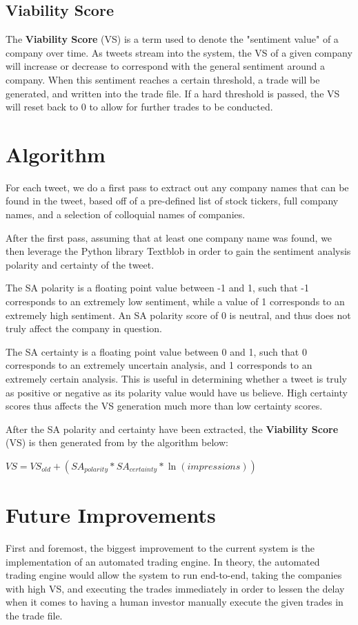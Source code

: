 \documentclass[11pt]{article}
\begin{document}
\subsection{Viability Score}
The {\bf Viability Score} (VS) is a term used
to denote the "sentiment value" of a company
over time. As tweets stream into the system,
the VS of a given company will increase or
decrease to correspond with the general
sentiment around a company. When this sentiment
reaches a certain threshold, a trade will be
generated, and written into the trade file.
If a hard threshold is passed, the VS will
reset back to 0 to allow for further trades
to be conducted.

\section{Algorithm}
For each tweet, we do a first pass to extract
out any company names that can be found in the
tweet, based off of a pre-defined list of stock
tickers, full company names, and a selection of
colloquial names of companies.

After the first pass, assuming that at least one
company name was found, we then leverage the
Python library Textblob in order to gain the
sentiment analysis polarity and certainty of
the tweet.

The SA polarity is a floating point value
between -1 and 1, such that -1 corresponds
to an extremely low sentiment, while a value
of 1 corresponds to an extremely high sentiment.
An SA polarity score of 0 is neutral, and
thus does not truly affect the company in
question.

The SA certainty is a floating point value
between 0 and 1, such that 0 corresponds to
an extremely uncertain analysis, and 1 corresponds
to an extremely certain analysis. This is
useful in determining whether a tweet is truly
as positive or negative as its polarity value
would have us believe. High certainty scores
thus affects the VS generation much more than
low certainty scores.

After the SA polarity and certainty have
been extracted, the {\bf Viability Score} (VS)
is then generated from by the algorithm below:

$VS = VS_{old} + (SA_{polarity} * SA_{certainty} * \ln(impressions))$

\section{Future Improvements}
First and foremost, the biggest improvement to the
current system is the implementation of an automated
trading engine. In theory, the automated trading engine
would allow the system to run end-to-end, taking the
companies with high VS, and executing the trades immediately
in order to lessen the delay when it comes to having a
human investor manually execute the given trades in the
trade file.
\end{document}
